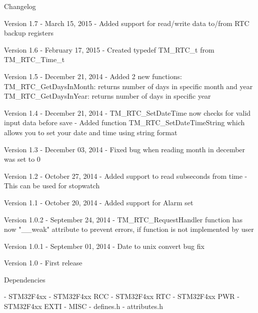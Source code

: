 \begin{DoxyParagraph}{Changelog}

\end{DoxyParagraph}
\begin{DoxyVerb} Version 1.7
   - March 15, 2015
   - Added support for read/write data to/from RTC backup registers

 Version 1.6
   - February 17, 2015
   - Created typedef TM_RTC_t from TM_RTC_Time_t

 Version 1.5
   - December 21, 2014
   - Added 2 new functions:
      TM_RTC_GetDaysInMonth: returns number of days in specific month and year
      TM_RTC_GetDaysInYear: returns number of days in specific year

 Version 1.4
   - December 21, 2014
   - TM_RTC_SetDateTime now checks for valid input data before save
   - Added function TM_RTC_SetDateTimeString which allows you to set your
      date and time using string format

 Version 1.3
   - December 03, 2014
   - Fixed bug when reading month in december was set to 0

 Version 1.2
   - October 27, 2014
   - Added support to read subseconds from time
   - This can be used for stopwatch

 Version 1.1
   - October 20, 2014
   - Added support for Alarm set

 Version 1.0.2
   - September 24, 2014
   - TM_RTC_RequestHandler function has now "__weak" attribute to prevent errors,
      if function is not implemented by user

 Version 1.0.1
   - September 01, 2014
   - Date to unix convert bug fix

 Version 1.0
   - First release
\end{DoxyVerb}


\begin{DoxyParagraph}{Dependencies}

\end{DoxyParagraph}
\begin{DoxyVerb} - STM32F4xx
 - STM32F4xx RCC
 - STM32F4xx RTC
 - STM32F4xx PWR
 - STM32F4xx EXTI
 - MISC
 - defines.h
 - attributes.h
\end{DoxyVerb}
 